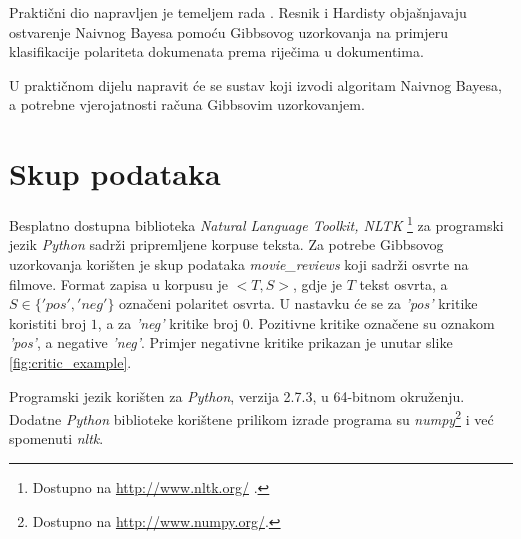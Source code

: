 Praktični dio napravljen je temeljem rada \citep{resnik2010gibbs}. Resnik i Hardisty objašnjavaju ostvarenje Naivnog Bayesa  pomoću Gibbsovog uzorkovanja na primjeru klasifikacije polariteta dokumenata prema riječima u dokumentima. 

U praktičnom dijelu napravit će se sustav koji izvodi algoritam Naivnog Bayesa, a potrebne vjerojatnosti računa Gibbsovim uzorkovanjem. 

\section{Skup podataka}
\label{sec:skup}
Besplatno dostupna biblioteka \textit{Natural Language Toolkit, NLTK} \footnote{Dostupno na \url{http://www.nltk.org/} .} za programski jezik \textit{Python} sadrži pripremljene korpuse teksta. 
Za potrebe Gibbsovog uzorkovanja korišten je skup podataka \textit{movie\_reviews} koji sadrži osvrte na filmove. Format zapisa u korpusu je $<T, S>$, gdje je $T$ tekst osvrta, a $S \in \{'pos', 'neg'\}$ označeni polaritet osvrta. U nastavku će se za \textit{'pos'} kritike koristiti broj $1$, a za \textit{'neg'} kritike broj $0$. Pozitivne kritike označene su oznakom \textit{'pos'}, a negative \textit{'neg'}. Primjer negativne kritike prikazan je unutar slike \ref{fig:critic_example}.

Programski jezik korišten za \textit{Python}, verzija 2.7.3, u 64-bitnom okruženju. Dodatne \textit{Python} biblioteke korištene prilikom izrade programa su \textit{numpy}\footnote{Dostupno na \url{http://www.numpy.org/}.} i već spomenuti \textit{nltk}.

